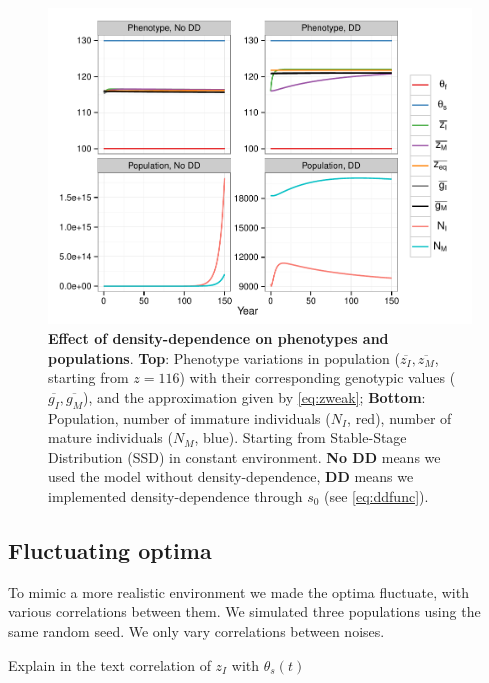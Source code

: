 \begin{figure}[ht!]
	\centering
	\includegraphics[scale=1]{Figures/DDphenopop.pdf}
	\caption{\textbf{Effect of density-dependence on phenotypes and populations}. \textbf{Top}: Phenotype variations in population ($\overline{z_I}, \overline{z_M}$, starting from $z = 116$) with their corresponding genotypic values ($\overline{g_I}, \overline{g_M}$), and the approximation given by \autoref{eq:zweak}; \textbf{Bottom}: Population, number of immature individuals ($N_I$, red), number of mature individuals ($N_M$, blue). Starting from Stable-Stage Distribution (SSD) in constant environment. \textbf{No DD} means we used the model without density-dependence, \textbf{DD} means we implemented density-dependence through $s_0$ (see \autoref{eq:ddfunc}).}
	\label{fig:dd}
\end{figure}

\subsection*{Fluctuating optima}

To mimic a more realistic environment we made the optima fluctuate, with various correlations between them. We simulated three populations using the same random seed. We only vary correlations between noises.

Explain in the text correlation of $z_{I}$ with $\theta_{s}(t)$

